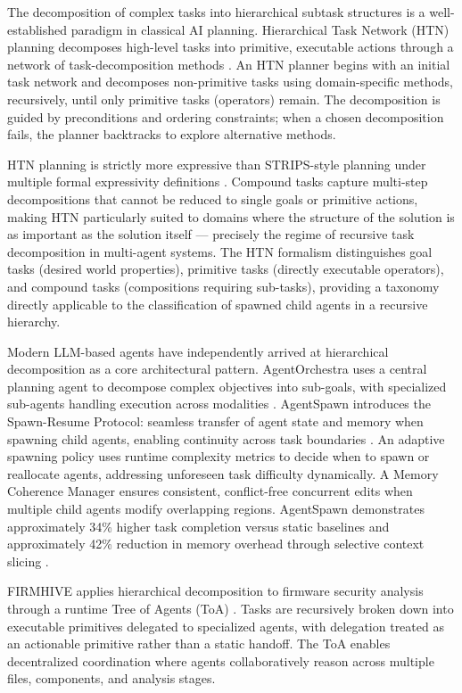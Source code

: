 The decomposition of complex tasks into hierarchical subtask structures is a well-established paradigm in classical AI planning. Hierarchical Task Network (HTN) planning decomposes high-level tasks into primitive, executable actions through a network of task-decomposition methods \cite{erol1994umcp, erol1996complexity, htn-survey2015}. An HTN planner begins with an initial task network and decomposes non-primitive tasks using domain-specific methods, recursively, until only primitive tasks (operators) remain. The decomposition is guided by preconditions and ordering constraints; when a chosen decomposition fails, the planner backtracks to explore alternative methods.

HTN planning is strictly more expressive than STRIPS-style planning under multiple formal expressivity definitions \cite{erol1994umcp}. Compound tasks capture multi-step decompositions that cannot be reduced to single goals or primitive actions, making HTN particularly suited to domains where the structure of the solution is as important as the solution itself — precisely the regime of recursive task decomposition in multi-agent systems. The HTN formalism distinguishes goal tasks (desired world properties), primitive tasks (directly executable operators), and compound tasks (compositions requiring sub-tasks), providing a taxonomy directly applicable to the classification of spawned child agents in a recursive hierarchy.

Modern LLM-based agents have independently arrived at hierarchical decomposition as a core architectural pattern. AgentOrchestra uses a central planning agent to decompose complex objectives into sub-goals, with specialized sub-agents handling execution across modalities \cite{agentorchestra2025}. AgentSpawn introduces the Spawn-Resume Protocol: seamless transfer of agent state and memory when spawning child agents, enabling continuity across task boundaries \cite{agentspawn2025}. An adaptive spawning policy uses runtime complexity metrics to decide when to spawn or reallocate agents, addressing unforeseen task difficulty dynamically. A Memory Coherence Manager ensures consistent, conflict-free concurrent edits when multiple child agents modify overlapping regions. AgentSpawn demonstrates approximately 34\% higher task completion versus static baselines and approximately 42\% reduction in memory overhead through selective context slicing \cite{agentspawn2025}.

FIRMHIVE applies hierarchical decomposition to firmware security analysis through a runtime Tree of Agents (ToA) \cite{firmhive2025}. Tasks are recursively broken down into executable primitives delegated to specialized agents, with delegation treated as an actionable primitive rather than a static handoff. The ToA enables decentralized coordination where agents collaboratively reason across multiple files, components, and analysis stages.

